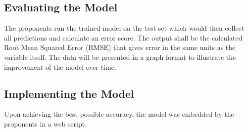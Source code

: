 \documentclass[10pt,11pt,12pt,oneside]{book}
\begin{document}
    \subsection{Evaluating the Model}
    The proponents run the trained model on the test set which would then collect all predictions and calculate an error score. The output shall be the calculated Root Mean Squared Error (RMSE) that gives error in the same units as the variable itself. The data will be presented in a graph format to illustrate the improvement of the model over time.
    \subsection{Implementing the Model}
    Upon achieving the best possible accuracy, the model was embedded by the proponents in a web script.
    
    
\end{document}
